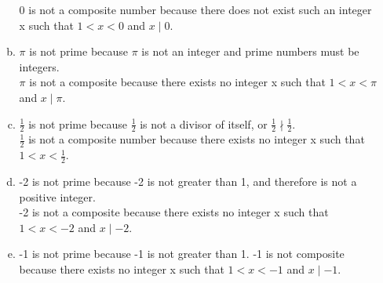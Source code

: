 \documentclass{article}
\begin{document}
\begin{enumerate}[label=(3.\arabic*),start=1]
\begin{enumerate}[(a)]
                  0 is not a composite number because there does not exist such an integer x such that $1<x<0$ and $x\mid0$.
            \item $\pi$ is not prime because $\pi$ is not an integer and prime numbers must be integers. \\
                  $\pi$ is not a composite because there exists no integer x such that $1<x<\pi$ and $x\mid\pi$.
            \item $\frac{1}{2}$ is not prime because $\frac{1}{2}$ is not a divisor of itself, or $\frac{1}{2}\nmid\frac{1}{2}$. \\
                  $\frac{1}{2}$ is not a composite number because there exists no integer x such that $1<x<\frac{1}{2}$. 
            \item -2 is not prime because -2 is not greater than 1, and therefore is not a positive integer. \\
                  -2 is not a composite because there exists no integer x such that $1<x<-2$ and $x\mid-2$.
            \item -1 is not prime because -1 is not greater than 1. -1 is not composite because there exists no integer x such that $1<x<-1$ and $x\mid-1$.
        \end{enumerate}
\end{enumerate}
\end{document}
